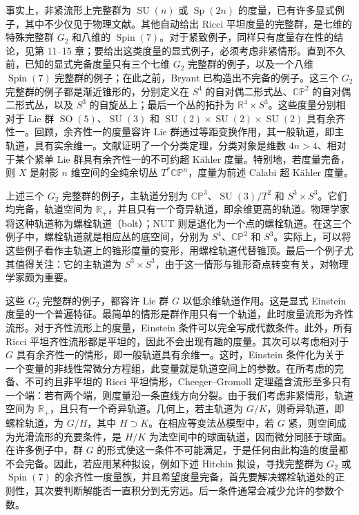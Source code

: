 事实上，非紧流形上完整群为 $\operatorname{SU}(n)$ 或 $\operatorname{Sp}(2n)$ 的度量，已有许多显式例子，其中不少仅见于物理文献。其他自动给出 Ricci 平坦度量的完整群，是七维的特殊完整群 $G_2$ 和八维的 $\operatorname{Spin}(7)$。对于紧致例子，同样只有度量存在性的结论，见第 11--15 章；要给出这类度量的显式例子，必须考虑非紧情形。直到不久前，已知的显式完备度量只有三个七维 $G_2$ 完整群的例子，以及一个八维 $\operatorname{Spin}(7)$ 完整群的例子；在此之前，Bryant 已构造出不完备的例子。这三个 $G_2$ 完整群的例子都是渐近锥形的，分别定义在 $S^4$ 的自对偶二形式丛、$\mathbb{CP}^2$ 的自对偶二形式丛，以及 $S^3$ 的自旋丛上；最后一个丛的拓扑为 $\mathbb R^4\times S^3$。这些度量分别相对于 Lie 群 $\operatorname{SO}(5)$、$\operatorname{SU}(3)$ 和 $\operatorname{SU}(2)\times\operatorname{SU}(2)\times\operatorname{SU}(2)$ 具有余齐性一。回顾，余齐性一的度量容许 Lie 群通过等距变换作用，其一般轨道，即主轨道，具有实余维一。文献证明了一个分类定理，分类对象是维数 $4n>4$、相对于某个紧单 Lie 群具有余齐性一的不可约超 Kähler 度量。特别地，若度量完备，则 $X$ 是射影 $n$ 维空间的全纯余切丛 $T^*\mathbb{CP}^n$，度量为前述 Calabi 超 Kähler 度量。

上述三个 $G_2$ 完整群的例子，主轨道分别为 $\mathbb{CP}^3$、$\operatorname{SU}(3)/T^2$ 和 $S^3\times S^3$。它们均完备，轨道空间为 $\mathbb R_+$，并且只有一个奇异轨道，即余维更高的轨道。物理学家将这种轨道称为螺栓轨道（bolt）；NUT 则是退化为一个点的螺栓轨道。在这三个例子中，螺栓轨道就是相应丛的底空间，分别为 $S^4$、$\mathbb{CP}^2$ 和 $S^3$。实际上，可以将这些例子看作主轨道上的锥形度量的变形，用螺栓轨道代替锥顶。最后一个例子尤其值得关注：它的主轨道为 $S^3\times S^3$，由于这一情形与锥形奇点转变有关，对物理学家颇为重要。

这些 $G_2$ 完整群的例子，都容许 Lie 群 $G$ 以低余维轨道作用。这是显式 Einstein 度量的一个普遍特征。最简单的情形是群作用只有一个轨道，此时度量流形为齐性流形。对于齐性流形上的度量，Einstein 条件可以完全写成代数条件。此外，所有 Ricci 平坦齐性流形都是平坦的，因此不会出现有趣的度量。其次可以考虑相对于 $G$ 具有余齐性一的情形，即一般轨道具有余维一。这时，Einstein 条件化为关于一个变量的非线性常微分方程组，此变量就是轨道空间上的参数。在所考虑的完备、不可约且非平坦的 Ricci 平坦情形，Cheeger--Gromoll 定理蕴含流形至多只有一个端：若有两个端，则度量沿一条直线方向分裂。由于我们考虑非紧情形，轨道空间为 $\mathbb R_+$，且只有一个奇异轨道。几何上，若主轨道为 $G/K$，则奇异轨道，即螺栓轨道，为 $G/H$，其中 $H\supset K$。在相应等变法丛模型中，若 $G$ 紧，则空间成为光滑流形的充要条件，是 $H/K$ 为法空间中的球面轨道，因而微分同胚于球面。在许多例子中，群 $G$ 的形式使这一条件不可能满足，于是任何由此构造的度量都不会完备。因此，若应用某种拟设，例如下述 Hitchin 拟设，寻找完整群为 $G_2$ 或 $\operatorname{Spin}(7)$ 的余齐性一度量族，并且希望度量完备，首先要解决螺栓轨道处的正则性，其次要判断解能否一直积分到无穷远。后一条件通常会减少允许的参数个数。

